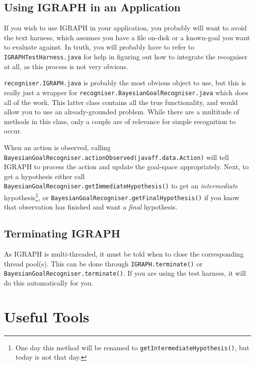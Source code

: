 \documentclass[10pt,a4paper]{article}
\begin{document}
\begin{sloppypar}
\subsection{Using \textsc{IGRAPH} in an Application}
\label{subsec:igraph_integration}

If you wish to use \textsc{IGRAPH} in your application, you probably will want to avoid the text harness, which assumes you have a file on-disk or a known-goal you want to evaluate against. In truth, you will probably have to refer to \texttt{IGRAPHTestHarness.java} for help in figuring out how to integrate the recogniser at all, as this process is not very obvious.

\texttt{recogniser.IGRAPH.java} is probably the most obvious object to use, but this is really just a wrapper for \texttt{recogniser.BayesianGoalRecogniser.java} which does all of the work. This latter class contains all the true functionality, and would allow you to use an already-grounded problem. While there are a multitude of methods in this class, only a couple are of relevance for simple recognition to occur. 

When an action is observed, calling \\ \texttt{BayesianGoalRecogniser.actionObserved(javaff.data.Action)} will tell \textsc{IGRAPH} to process the action and update the goal-space appropriately.  Next, to get a hypothesis either call \texttt{BayesianGoalRecogniser.getImmediateHypothesis()} to get an \emph{intermediate} hypothesis\footnote{One day this method will be renamed to \texttt{getIntermediateHypothesis()}, but today is not that day.}, or \texttt{BayesianGoalRecogniser.getFinalHypothesis()} if you know that observation has finished and want a \emph{final} hypothesis.


\subsection{Terminating \textsc{IGRAPH}}

As \textsc{IGRAPH} is multi-threaded, it must be told when to close the corresponding thread pool(s). This can be done through \texttt{IGRAPH.terminate()} or \texttt{BayesianGoalRecogniser.terminate()}. If you are using the test harness, it will do this automatically for you.

\end{sloppypar}


\section{Useful Tools}
\end{document}
